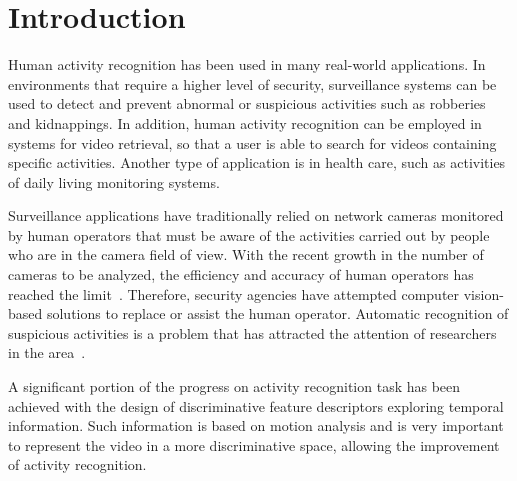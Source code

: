 \documentclass[10pt,conference]{IEEEtran}
\begin{document}
\IEEEpeerreviewmaketitle

\section{Introduction}\label{introduction}

Human activity recognition has been used in many real-world applications. In environments that require a higher level of security, surveillance systems can be used to detect and prevent abnormal or suspicious activities such as robberies and kidnappings. In addition, human activity recognition can be employed in systems for video retrieval, so that a user is able to search for videos containing specific activities. Another type of application is in health care, such as activities of daily living  monitoring systems.

Surveillance applications have traditionally relied on network cameras monitored by human operators that must be aware of the activities carried out by people who are in the camera field of view. With the recent growth in the number of cameras to be analyzed, the efficiency and accuracy of human operators has reached the limit~\cite{Keval:2006}. Therefore, security agencies have attempted computer vision-based solutions to replace or assist the human operator. Automatic recognition of suspicious activities is a problem that has attracted the attention of researchers in the area~\cite{Danafar:2007, Reddy:2011, Wiliem:2012, WangAndXu:2016}.

A significant portion of the progress on activity recognition task has been achieved with the design of discriminative feature descriptors exploring temporal information. Such information is based on motion analysis and is very important to represent the video in a more discriminative space, allowing the improvement of activity recognition.
\end{document}

